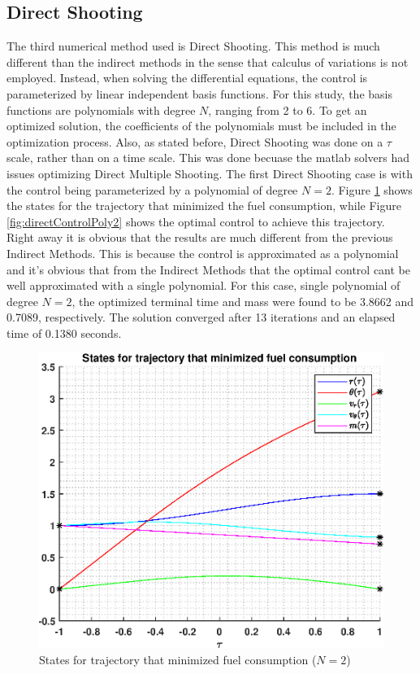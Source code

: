 \documentclass[]{article}
\begin{document}
\subsection{Direct Shooting}
The third numerical method used is Direct Shooting. This method is much different than the indirect methods in the sense that calculus of variations is not employed. Instead, when solving the differential equations, the control is parameterized by linear independent basis functions. For this study, the basis functions are polynomials with degree \(N\), ranging from 2 to 6. To get an optimized solution, the coefficients of the polynomials must be included in the optimization process. Also, as stated before, Direct Shooting was done on a \(\tau\) scale, rather than on a time scale. This was done becuase the matlab solvers had issues optimizing Direct Multiple Shooting.
\vspace{2mm}\newline 
The first Direct Shooting case is with the control being parameterized by a polynomial of degree \(N = 2\). Figure \ref{fig:directStatesPoly2} shows the states for the trajectory that minimized the fuel consumption, while Figure \ref{fig:directControlPoly2} shows the optimal control to achieve this trajectory. Right away it is obvious that the results are much different from the previous Indirect Methods. This is because the control is approximated as a polynomial and it's obvious that from the Indirect Methods that the optimal control cant be well approximated with a single polynomial. For this case, single polynomial of degree \(N = 2\), the optimized terminal time and mass were found to be 3.8662 and 0.7089, respectively. The solution converged after 13 iterations and an elapsed time of 0.1380 seconds.
\begin{figure}
	\centering
	\includegraphics[scale=0.75]{directStatesPoly2.eps}
	\caption{States for trajectory that minimized fuel consumption (\(N = 2\))}
	\label{fig:directStatesPoly2}
\end{figure}
\end{document}
